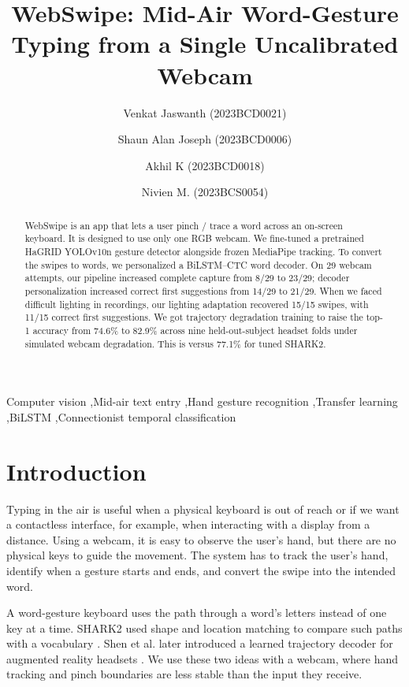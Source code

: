 \documentclass[preprint,12pt]{elsarticle}
\begin{document}
\begin{frontmatter}
\title{WebSwipe: Mid-Air Word-Gesture Typing from a Single Uncalibrated Webcam}
\author[1]{Venkat Jaswanth (2023BCD0021)}
\author[1]{Shaun Alan Joseph (2023BCD0006)}
\author[1]{Akhil K (2023BCD0018)}
\author[1]{Nivien M. (2023BCS0054)}
\address[1]{Indian Institute of Information Technology, Kottayam, India}

\begin{abstract}
WebSwipe is an app that lets a user pinch / trace a word across an on-screen keyboard. It is designed to use only one RGB webcam. We fine-tuned a pretrained HaGRID YOLOv10n gesture detector alongside frozen MediaPipe tracking. To convert the swipes to words, we personalized a BiLSTM--CTC word decoder. On 29 webcam attempts, our pipeline increased complete capture from 8/29 to 23/29; decoder personalization increased correct first suggestions from 14/29 to 21/29. When we faced difficult lighting in recordings, our lighting adaptation recovered 15/15 swipes, with 11/15 correct first suggestions. We got trajectory degradation training to raise the top-1 accuracy from 74.6\% to 82.9\% across nine held-out-subject headset folds under simulated webcam degradation. This is versus 77.1\% for tuned SHARK2.

\end{abstract}
\begin{keyword}
Computer vision \sep Mid-air text entry \sep Hand gesture recognition \sep Transfer learning \sep BiLSTM \sep Connectionist temporal classification
\end{keyword}
\end{frontmatter}
\linenumbers

\section{Introduction}
Typing in the air is useful when a physical keyboard is out of reach or if we want a contactless interface, for example, when interacting with a display from a distance. Using a webcam, it is easy to observe the user's hand, but there are no physical keys to guide the movement. The system has to track the user's hand, identify when a gesture starts and ends, and convert the swipe into the intended word.

A word-gesture keyboard uses the path through a word's letters instead of one key at a time. SHARK2 used shape and location matching to compare such paths with a vocabulary \cite{shark2}. Shen et al. later introduced a learned trajectory decoder for augmented reality headsets \cite{shen2023}. We use these two ideas with a webcam, where hand tracking and pinch boundaries are less stable than the input they receive.
\end{document}

